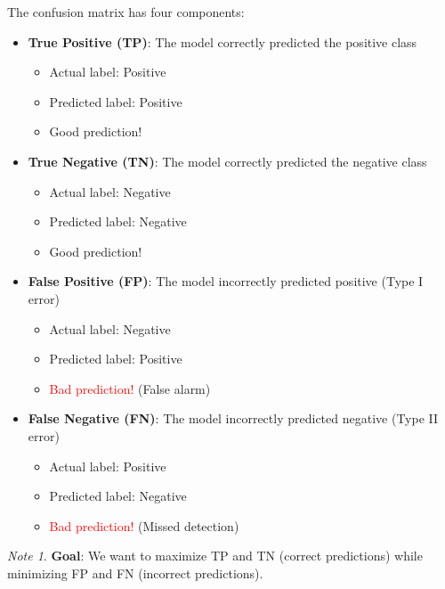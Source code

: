 \documentclass[11pt,a4paper]{article}
\theoremstyle{definition}
\theoremstyle{plain}
\theoremstyle{remark}
\newtheorem*{remark}{Note}
\begin{document}
The confusion matrix has four components:

\begin{itemize}
    \item \textbf{True Positive (TP)}: The model correctly predicted the positive class
    \begin{itemize}
        \item Actual label: Positive
        \item Predicted label: Positive
        \item \textcolor{blue!70}{Good prediction!}
    \end{itemize}
    
    \item \textbf{True Negative (TN)}: The model correctly predicted the negative class
    \begin{itemize}
        \item Actual label: Negative
        \item Predicted label: Negative
        \item \textcolor{green!60!black}{Good prediction!}
    \end{itemize}
    
    \item \textbf{False Positive (FP)}: The model incorrectly predicted positive (Type I error)
    \begin{itemize}
        \item Actual label: Negative
        \item Predicted label: Positive
        \item \textcolor{red}{Bad prediction!} (False alarm)
    \end{itemize}
    
    \item \textbf{False Negative (FN)}: The model incorrectly predicted negative (Type II error)
    \begin{itemize}
        \item Actual label: Positive
        \item Predicted label: Negative
        \item \textcolor{red}{Bad prediction!} (Missed detection)
    \end{itemize}
\end{itemize}

\begin{remark}
\textbf{Goal}: We want to maximize TP and TN (correct predictions) while minimizing FP and FN (incorrect predictions).
\end{remark}
\end{document}
